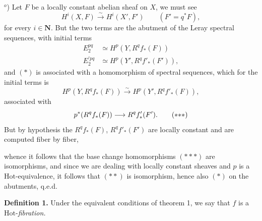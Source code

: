 \documentclass[11pt]{article}
\newcommand{\msp}[1]{\marginpar{\footnotesize [#1]}}
\newcommand{\Hot}{\mathrm{Hot}}
\begin{document}
$^o$) Let $F$ be a locally constant abelian sheaf on $X$, we must see
\[
H^i(X,F) \xrightarrow{\ \sim\ } H^i(X', F') \qquad (F' = q^*F), \tag*{$(*)$}
\]
for every $i \in \mathbf{N}$. But the two terms are the abutment of the Leray spectral sequences, with initial terms
\[
\begin{aligned}
E_2^{pq} &\simeq H^p(Y, R^q f_*(F)) \\
E^{\prime pq}_2 &\simeq H^p(Y', R^q f'_*(F')),
\end{aligned}
\]
and $(*)$ is associated with a homomorphism of spectral sequences, which for the initial terms is
\[
H^p(Y, R^q f_*(F)) \xrightarrow{\sim} H^p(Y', R^q f'_*(F)), \tag*{$(**)$} %
\]
associated with
\[
p^*(R^q f_*(F)) \longrightarrow R^q f'_*(F'). \tag*{$(*{*}*)$}
\]
But by hypothesis the $R^q f_*(F)$, $R^q f'_*(F')$ are locally constant and are computed fiber by fiber,

\msp{page 131}

\noindent whence it follows that the base change homomorphisms $(*{*}*)$ are isomorphisms, and since we are dealing with locally constant sheaves and $p$ is a $\Hot$-equivalence, it follows that $(**)$ is isomorphism, hence also $(*)$ on the abutments, q.e.d.

\noindent\textbf{Definition 1.} Under the equivalent conditions of theorem 1, we say that $f$ is a $\Hot$-\textit{fibration.}
\end{document}
